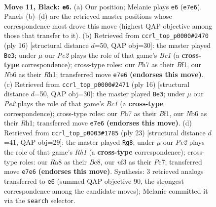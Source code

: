 \documentclass[11pt]{article}
\begin{document}
\clearpage

\begin{figure}[p]\centering
\begin{subfigure}{0.46\textwidth}\centering
\resizebox{\linewidth}{!}{%
\newchessgame
\chessboard[
  setfen={r1b1kb1r/1p2pppp/pnn5/4P3/8/5NP1/PP3P1P/RNBK1B1R b kq - 0 11},
  showmover=false,
  pgfstyle=straightmove, color=movearrow, markmove={e7-e6}
]}
\caption{}
\end{subfigure}\hfill
\begin{subfigure}{0.46\textwidth}\centering
\resizebox{\linewidth}{!}{%
\newchessgame
\chessboard[
  setfen={rnbr2k1/ppp2pbp/5np1/4p3/2P1P3/2N2N1P/PP3PP1/R1B1KB1R w KQ - 0 9},
  showmover=false,
  pgfstyle=straightmove, color=movearrow, markmove={c1-e3}
]}
\caption{}
\end{subfigure}
\\[4pt]
\begin{subfigure}{0.46\textwidth}\centering
\resizebox{\linewidth}{!}{%
\newchessgame
\chessboard[
  setfen={rnbr2k1/ppp2pbp/5np1/4p3/2P1P3/2N2N1P/PP3PP1/R1B1KB1R w KQ - 0 9},
  showmover=false,
  pgfstyle=straightmove, color=movearrow, markmove={c1-e3}
]}
\caption{}
\end{subfigure}\hfill
\begin{subfigure}{0.46\textwidth}\centering
\resizebox{\linewidth}{!}{%
\newchessgame
\chessboard[
  setfen={r1b1k2r/ppp1bp1p/2np1n2/8/3P1B1P/2P5/PP3NP1/RN2KB1R b KQkq - 0 12},
  showmover=false,
  pgfstyle=straightmove, color=movearrow, markmove={h8-g8}
]}
\caption{}
\end{subfigure}
\caption{\textbf{Move 11, Black: \texttt{e6}.} (a) Our position; Melanie plays \texttt{e6} (\texttt{e7e6}). Panels (b)--(d) are the retrieved master positions whose correspondence most drove this move (highest QAP objective among those that transfer to it). (b) Retrieved from \texttt{ccrl\_top\_p0000\#2470} (ply 16) [structural distance $d$=50, QAP obj=30]: the master played \texttt{Be3}; under $\mu$ our \emph{Pe2} plays the role of that game's \emph{Bc1} (a \textbf{cross-type} correspondence); cross-type roles: our \emph{P}h7 as their \emph{B}f1, our \emph{N}b6 as their \emph{R}h1; transferred move \texttt{e7e6} \textbf{(endorses this move)}. (c) Retrieved from \texttt{ccrl\_top\_p0000\#2471} (ply 16) [structural distance $d$=50, QAP obj=30]: the master played \texttt{Be3}; under $\mu$ our \emph{Pe2} plays the role of that game's \emph{Bc1} (a \textbf{cross-type} correspondence); cross-type roles: our \emph{P}h7 as their \emph{B}f1, our \emph{N}b6 as their \emph{R}h1; transferred move \texttt{e7e6} \textbf{(endorses this move)}. (d) Retrieved from \texttt{ccrl\_top\_p0003\#1785} (ply 23) [structural distance $d$=41, QAP obj=29]: the master played \texttt{Rg8}; under $\mu$ our \emph{Pe2} plays the role of that game's \emph{Rh1} (a \textbf{cross-type} correspondence); cross-type roles: our \emph{R}a8 as their \emph{B}c8, our \emph{n}f3 as their \emph{P}c7; transferred move \texttt{e7e6} \textbf{(endorses this move)}. Synthesis: 3 retrieved analogs transferred to \texttt{e6} (summed QAP objective 90, the strongest correspondence among the candidate moves); Melanie committed it via the \texttt{search} selector.}
\label{fig:thought-m21}
\end{figure}
\end{document}
